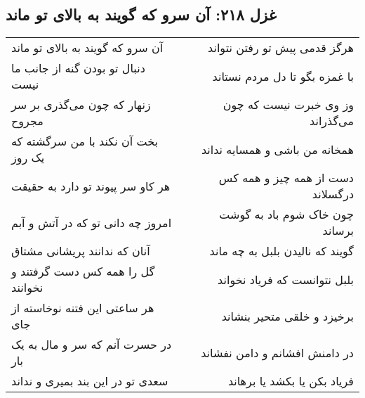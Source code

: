 \begin{center}
\section*{غزل ۲۱۸: آن سرو که گویند به بالای تو ماند}
\label{sec:218}
\begin{longtable}{l p{0.5cm} r}
آن سرو که گویند به بالای تو ماند
&&
هرگز قدمی پیش تو رفتن نتواند
\\
دنبال تو بودن گنه از جانب ما نیست
&&
با غمزه بگو تا دل مردم نستاند
\\
زنهار که چون می‌گذری بر سر مجروح
&&
وز وی خبرت نیست که چون می‌گذراند
\\
بخت آن نکند با من سرگشته که یک روز
&&
همخانه من باشی و همسایه نداند
\\
هر کاو سر پیوند تو دارد به حقیقت
&&
دست از همه چیز و همه کس درگسلاند
\\
امروز چه دانی تو که در آتش و آبم
&&
چون خاک شوم باد به گوشت برساند
\\
آنان که ندانند پریشانی مشتاق
&&
گویند که نالیدن بلبل به چه ماند
\\
گل را همه کس دست گرفتند و نخوانند
&&
بلبل نتوانست که فریاد نخواند
\\
هر ساعتی این فتنه نوخاسته از جای
&&
برخیزد و خلقی متحیر بنشاند
\\
در حسرت آنم که سر و مال به یک بار
&&
در دامنش افشانم و دامن نفشاند
\\
سعدی تو در این بند بمیری و نداند
&&
فریاد بکن یا بکشد یا برهاند
\\
\end{longtable}
\end{center}
